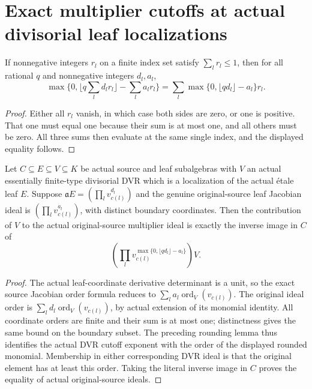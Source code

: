 \section{Exact multiplier cutoffs at actual divisorial leaf localizations}

\begin{lemma}\label{lem:sc0-multiplier-rounding-order-one}
\leanok
If nonnegative integers $r_l$ on a finite index set satisfy $\sum_l r_l\le1$,
then for all rational $q$ and nonnegative integers $d_l,a_l$,
\[
 \max\{0,\lfloor q\sum_l d_lr_l\rfloor-\sum_l a_lr_l\}
 =\sum_l\max\{0,\lfloor qd_l\rfloor-a_l\}r_l.
\]
\end{lemma}
\begin{proof}
Either all $r_l$ vanish, in which case both sides are zero, or one is
positive. That one must equal one because their sum is at most one,
and all others must be zero. All three sums then evaluate at the same
single index, and the displayed equality follows.
\end{proof}

\begin{theorem}\label{thm:sc0-multiplier-localized-leaf-formula}
\leanok
{}
Let $C\subseteq E\subseteq V\subseteq K$ be actual source and leaf
subalgebras with $V$ an actual essentially finite-type divisorial DVR
which is a localization of the actual \'etale leaf $E$. Suppose
$\mathfrak aE=(\prod_l v_{c(l)}^{d_l})$ and the genuine original-source
leaf Jacobian ideal is $(\prod_l v_{c(l)}^{a_l})$, with distinct boundary
coordinates. Then the contribution of $V$ to the actual original-source
multiplier ideal is exactly the inverse image in $C$ of
\[
 \left(\prod_l v_{c(l)}^{\max\{0,\lfloor qd_l\rfloor-a_l\}}\right)V.
\]
\end{theorem}
\begin{proof}
The actual leaf-coordinate derivative determinant is a unit, so the
exact source Jacobian order formula reduces to
$\sum_l a_l\operatorname{ord}_V(v_{c(l)})$.
The original ideal order is
$\sum_l d_l\operatorname{ord}_V(v_{c(l)})$, by actual extension of its
monomial identity. All coordinate orders are finite and their sum is
at most one; distinctness gives the same bound on the boundary subset.
The preceding rounding lemma thus identifies the actual DVR cutoff
exponent with the order of the displayed rounded monomial. Membership
in either corresponding DVR ideal is that the original element has
at least this order. Taking the literal inverse image in $C$ proves
the equality of actual original-source ideals.
\end{proof}
